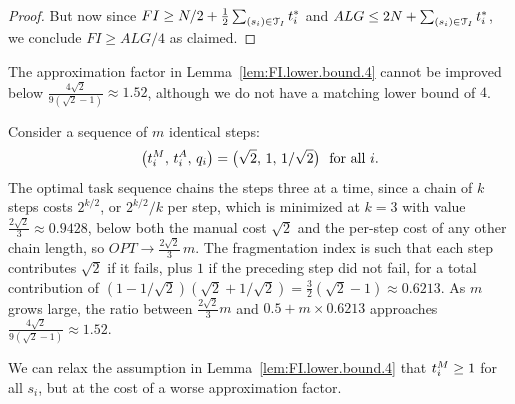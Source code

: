 \begin{proof}
    But now since $FI \geq N/2 + \frac{1}{2}\sum_{(s_i) \in \mathcal{T}_I}t^*_{i}$ and $ALG \leq 2N + \sum_{(s_i) \in \mathcal{T}_I}t^*_{i}$, we conclude $FI \geq ALG/4$ as claimed.
\end{proof}

The approximation factor in Lemma~\ref{lem:FI.lower.bound.4} cannot be improved below $\tfrac{4\sqrt{2}}{9(\sqrt{2}-1)} \approx 1.52$, although we do not have a matching lower bound of $4$.

\begin{example}
\label{ex:FI.lower.gap}
Consider a sequence of $m$ identical steps:
\[ 
\bigl(t^{M}_{i},\, t^{A}_{i},\, q_i\bigr) 
= 
\bigl(\sqrt{2},\, 1,\, 1/\sqrt{2}\bigr) \ \text{ for all $i$}. 
\]
The optimal task sequence chains the steps three at a time, since a chain of $k$ steps costs $2^{k/2}$, or $2^{k/2}/k$ per step, which is minimized at $k=3$ with value $\tfrac{2\sqrt{2}}{3} \approx 0.9428$, below both the manual cost $\sqrt{2}$ and the per-step cost of any other chain length, so $OPT \to \tfrac{2\sqrt{2}}{3}\,m$.
The fragmentation index is such that each step contributes $\sqrt{2}$ if it fails, plus $1$ if the preceding step did not fail, for a total contribution of $(1-1/\sqrt{2})(\sqrt{2} + 1/\sqrt{2}) = \tfrac{3}{2}(\sqrt{2}-1) \approx 0.6213$.
As $m$ grows large, the ratio between $\tfrac{2\sqrt{2}}{3}m$ and $0.5 + m \times 0.6213$ approaches $\tfrac{4\sqrt{2}}{9(\sqrt{2}-1)} \approx 1.52$.
\end{example}

We can relax the assumption in Lemma~\ref{lem:FI.lower.bound.4} that $t^{M}_{i} \geq 1$ for all $s_i$, but at the cost of a worse approximation factor.

